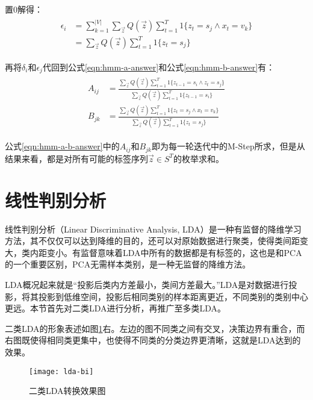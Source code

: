 置0解得：
\begin{align}
\label{eqn:hmm-epsilon-answer}
\begin{split}
\epsilon_{i} &= \sum_{k=1}^{|V|} \sum_{\vec{z}}Q(\vec{z})\sum_{t=1}^{T}1\{z_{t}=s_j\wedge{x_t=v_k}\} \\
           &= \sum_{\vec{z}}Q(\vec{z})\sum_{t=1}^{T}1\{z_{t}=s_j\}
\end{split}
\end{align} 

再将$\delta_{i}$和$\epsilon_{j}$代回到公式\ref{eqn:hmm-a-answer}和公式\ref{eqn:hmm-b-answer}有：
\begin{align}
\label{eqn:hmm-a-b-answer}
\begin{split}
A_{ij} &= \frac{\sum_{\vec{z}}Q(\vec{z})\sum_{t=1}^{T}1\{z_{t-1}=s_i\wedge{z_t=s_j}\}}{\sum_{\vec{z}}Q(\vec{z})\sum_{t=1}^{T}1\{z_{t-1}=s_i\}} \\
B_{jk} &=\frac{\sum_{\vec{z}}Q(\vec{z})\sum_{t=1}^{T}1\{z_{t}=s_j\wedge{x_t=v_k}\}}{\sum_{\vec{z}}Q(\vec{z})\sum_{t=1}^{T}1\{z_{t}=s_j\}} 
\end{split}
\end{align} 

公式\ref{eqn:hmm-a-b-answer}中的$A_{ij}$和$B_{jk}$即为每一轮迭代中的M-Step所求，但是从结果来看，都是对所有可能的标签序列$\vec{z}\in{S^{T}}$的枚举求和。
\section{线性判别分析}
线性判别分析（Linear Discriminative Analysis, LDA）是一种有监督的降维学习方法，其不仅仅可以达到降维的目的，还可以对原始数据进行聚类，使得类间距变大，类内距变小。有监督意味着LDA中所有的数据都是有标签的，这也是和PCA的一个重要区别，PCA无需样本类别，是一种无监督的降维方法。

LDA概况起来就是“投影后类内方差最小，类间方差最大。”LDA是对数据进行投影，将其投影到低维空间，投影后相同类别的样本距离更近，不同类别的类别中心更远。本节首先对二类LDA进行分析，再推广至多类LDA。

二类LDA的形象表述如图\ref{fig:lda-bi}右。左边的图不同类之间有交叉，决策边界有重合，而右图既使得相同类更集中，也使得不同类的分类边界更清晰，这就是LDA达到的效果。
\begin{figure}[htbp]
  \centering
  \texttt{[image: lda-bi]}
  \caption{二类LDA转换效果图 \label{fig:lda-bi}}
\end{figure}

